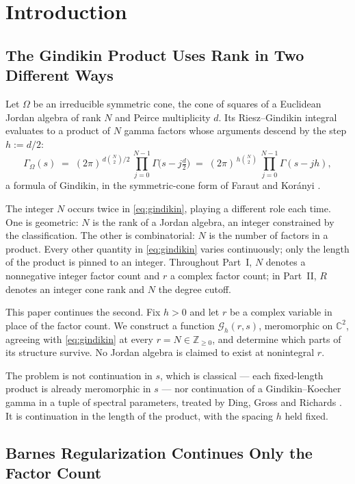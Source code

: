 \documentclass[11pt,letterpaper]{article}
\newcommand{\Gom}{\Gamma_{\Omega}}          %
\newcommand{\Gc}{\mathcal{G}}               %
\newcommand{\Zint}{\mathbb{Z}}
\newcommand{\Cc}{\mathbb{C}}
\begin{document}
\esrule

\section{Introduction}

\subsection{The Gindikin Product Uses Rank in Two Different Ways}

Let $\Omega$ be an irreducible symmetric cone, the cone of squares of a Euclidean
Jordan algebra of rank $N$ and Peirce multiplicity $d$. Its Riesz--Gindikin
integral evaluates to a product of $N$ gamma factors whose arguments descend by
the step $h:=d/2$:
\begin{equation}
  \Gom(s) \;=\; (2\pi)^{\,d\binom{N}{2}/2}\,\prod_{j=0}^{N-1}\Gamma\!\bigl(s-j\tfrac{d}{2}\bigr)
  \;=\; (2\pi)^{\,h\binom{N}{2}}\,\prod_{j=0}^{N-1}\Gamma(s-jh),
  \label{eq:gindikin}
\end{equation}
a formula of Gindikin, in the symmetric-cone form of Faraut and Kor\'anyi
\cite{FK,Gindikin}.

The integer $N$ occurs twice in \eqref{eq:gindikin}, playing a different role
each time. One is geometric: $N$ is the rank of a Jordan algebra, an integer constrained by
the classification. The other is combinatorial: $N$ is the number of factors in a
product. Every other quantity in \eqref{eq:gindikin} varies continuously; only
the length of the product is pinned to an integer. Throughout Part~I, $N$ denotes
a nonnegative integer factor count and $r$ a complex factor count; in Part~II, $R$
denotes an integer cone rank and $N$ the degree cutoff.

This paper continues the second. Fix $h>0$ and let $r$ be a complex variable in
place of the factor count. We construct a function $\Gc_h(r,s)$, meromorphic on
$\Cc^2$, agreeing with \eqref{eq:gindikin} at every $r=N\in\Zint_{\ge0}$, and
determine which parts of its structure survive. No Jordan algebra is claimed to
exist at nonintegral $r$.

The problem is not continuation in $s$, which is classical --- each fixed-length
product is already meromorphic in $s$ --- nor continuation of a
Gindikin--Koecher gamma in a tuple of spectral parameters, treated by Ding, Gross
and Richards \cite{DGR}. It is continuation in the length of the product, with
the spacing $h$ held fixed.

\subsection{Barnes Regularization Continues Only the Factor Count}
\end{document}
